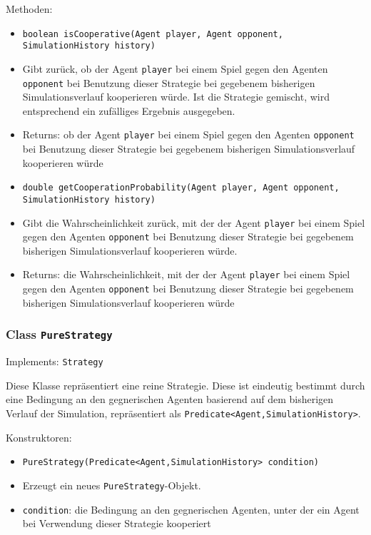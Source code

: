\documentclass[parskip=full,11pt]{scrartcl}
\begin{document}
Methoden:
\begin{itemize}\itemsep -10pt
\item \texttt{boolean isCooperative(Agent player, Agent opponent, SimulationHistory history)}
\item[] Gibt zurück, ob der Agent \texttt{player} bei einem Spiel gegen den Agenten \texttt{opponent} bei Benutzung dieser Strategie bei gegebenem bisherigen Simulationsverlauf kooperieren würde. Ist die Strategie gemischt, wird entsprechend ein zufälliges Ergebnis ausgegeben.
\item[] Returns: ob der Agent \texttt{player} bei einem Spiel gegen den Agenten \texttt{opponent} bei Benutzung dieser Strategie bei gegebenem bisherigen Simulationsverlauf kooperieren würde

\item \texttt{double getCooperationProbability(Agent player, Agent opponent, SimulationHistory history)}
\item[] Gibt die Wahrscheinlichkeit zurück, mit der der Agent \texttt{player} bei einem Spiel gegen den Agenten \texttt{opponent} bei Benutzung dieser Strategie bei gegebenem bisherigen Simulationsverlauf kooperieren würde.
\item[] Returns: die Wahrscheinlichkeit, mit der der Agent \texttt{player} bei einem Spiel gegen den Agenten \texttt{opponent} bei Benutzung dieser Strategie bei gegebenem bisherigen Simulationsverlauf kooperieren würde
\end{itemize}

\subsubsection{Class \texttt{PureStrategy}}
Implements: \texttt{Strategy}

Diese Klasse repräsentiert eine reine Strategie. Diese ist eindeutig bestimmt durch eine Bedingung an den gegnerischen Agenten basierend auf dem bisherigen Verlauf der Simulation, repräsentiert als \texttt{Predicate<Agent,SimulationHistory>}.

Konstruktoren:
\begin{itemize}\itemsep -10pt
\item \texttt{PureStrategy(Predicate<Agent,SimulationHistory> condition)}
\item[] Erzeugt ein neues \texttt{PureStrategy}-Objekt.
\item[] \texttt{condition}: die Bedingung an den gegnerischen Agenten, unter der ein Agent bei Verwendung dieser Strategie kooperiert
\end{itemize}
\end{document}
